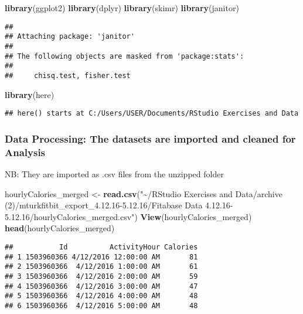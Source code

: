 \documentclass[
]{article}
\newenvironment{Shaded}{\begin{snugshade}}{\end{snugshade}}
\newcommand{\FunctionTok}[1]{\textcolor[rgb]{0.13,0.29,0.53}{\textbf{#1}}}
\newcommand{\NormalTok}[1]{#1}
\newcommand{\OtherTok}[1]{\textcolor[rgb]{0.56,0.35,0.01}{#1}}
\newcommand{\StringTok}[1]{\textcolor[rgb]{0.31,0.60,0.02}{#1}}
\begin{document}
\begin{Shaded}
\begin{Highlighting}[]
\FunctionTok{library}\NormalTok{(ggplot2)}
\FunctionTok{library}\NormalTok{(dplyr)}
\FunctionTok{library}\NormalTok{(skimr)}
\FunctionTok{library}\NormalTok{(janitor)}
\end{Highlighting}
\end{Shaded}

\begin{verbatim}
## 
## Attaching package: 'janitor'
## 
## The following objects are masked from 'package:stats':
## 
##     chisq.test, fisher.test
\end{verbatim}

\begin{Shaded}
\begin{Highlighting}[]
\FunctionTok{library}\NormalTok{(here)}
\end{Highlighting}
\end{Shaded}

\begin{verbatim}
## here() starts at C:/Users/USER/Documents/RStudio Exercises and Data
\end{verbatim}

\subsubsection{Data Processing: The datasets are imported and cleaned
for
Analysis}\label{data-processing-the-datasets-are-imported-and-cleaned-for-analysis}

NB: They are imported as .csv files from the unzipped folder

\begin{Shaded}
\begin{Highlighting}[]
\NormalTok{hourlyCalories\_merged }\OtherTok{\textless{}{-}} \FunctionTok{read.csv}\NormalTok{(}\StringTok{"\textasciitilde{}/RStudio Exercises and Data/archive (2)/mturkfitbit\_export\_4.12.16{-}5.12.16/Fitabase Data 4.12.16{-}5.12.16/hourlyCalories\_merged.csv"}\NormalTok{)}
\FunctionTok{View}\NormalTok{(hourlyCalories\_merged)}
\FunctionTok{head}\NormalTok{(hourlyCalories\_merged)}
\end{Highlighting}
\end{Shaded}

\begin{verbatim}
##           Id          ActivityHour Calories
## 1 1503960366 4/12/2016 12:00:00 AM       81
## 2 1503960366  4/12/2016 1:00:00 AM       61
## 3 1503960366  4/12/2016 2:00:00 AM       59
## 4 1503960366  4/12/2016 3:00:00 AM       47
## 5 1503960366  4/12/2016 4:00:00 AM       48
## 6 1503960366  4/12/2016 5:00:00 AM       48
\end{verbatim}
\end{document}
